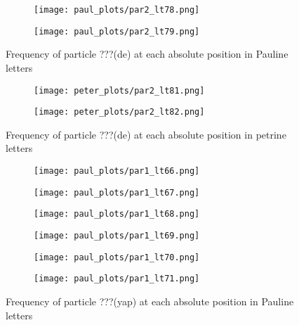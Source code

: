 \documentclass[a4paper]{article}
\begin{document}
\begin{figure}
\ContinuedFloat
\begin{subfigure}{0.45\textwidth}
\centering
\texttt{[image: paul\_plots/par2\_lt78.png]}
\end{subfigure}
\begin{subfigure}{0.45\textwidth}
\centering
\texttt{[image: paul\_plots/par2\_lt79.png]}
\end{subfigure}
\caption{Frequency of particle ???(de) at each absolute position in Pauline letters}
\end{figure}

\begin{figure}
\begin{subfigure}{0.45\textwidth}
\centering
\texttt{[image: peter\_plots/par2\_lt81.png]}
\end{subfigure}
\begin{subfigure}{0.45\textwidth}
\centering
\texttt{[image: peter\_plots/par2\_lt82.png]}
\end{subfigure}
\caption{Frequency of particle ???(de) at each absolute position in petrine letters}
\label{peter_de}
\end{figure}

\begin{figure}
\begin{subfigure}{0.45\textwidth}
\centering
\texttt{[image: paul\_plots/par1\_lt66.png]}
\end{subfigure}
\begin{subfigure}{0.45\textwidth}
\centering
\texttt{[image: paul\_plots/par1\_lt67.png]}
\end{subfigure}
\begin{subfigure}{0.45\textwidth}
\centering
\texttt{[image: paul\_plots/par1\_lt68.png]}
\end{subfigure}
\begin{subfigure}{0.45\textwidth}
\centering
\texttt{[image: paul\_plots/par1\_lt69.png]}
\end{subfigure}
\begin{subfigure}{0.45\textwidth}
\centering
\texttt{[image: paul\_plots/par1\_lt70.png]}
\end{subfigure}
\begin{subfigure}{0.45\textwidth}
\centering
\texttt{[image: paul\_plots/par1\_lt71.png]}
\end{subfigure}
\caption{Frequency of particle ???(yap) at each absolute position in Pauline letters}
\label{paul_yap}
\end{figure}
\end{document}
